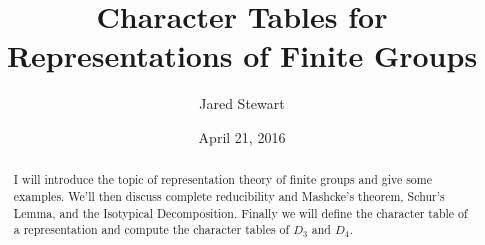 \documentclass{article}
\begin{document}
\title{Character Tables for Representations of Finite Groups}
\date{April 21, 2016}
\author{Jared Stewart}
\maketitle
\begin{abstract}
I will introduce the topic of representation theory of finite groups and give some examples.  We'll then discuss complete 
reducibility and Mashcke's theorem, Schur's Lemma, and the Isotypical Decomposition.  Finally we will define the character table 
of a representation and compute the character tables of $D_3$ and $D_4$. 
\end{abstract}
\end{document}
